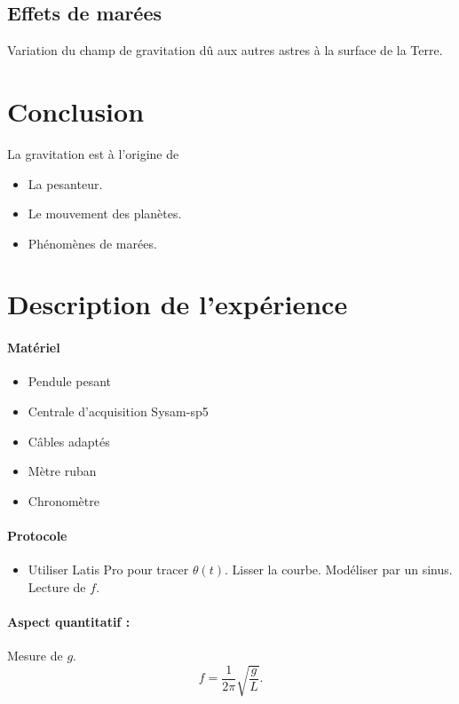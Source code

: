\documentclass[11pt]{report}
\numberwithin{figure}{section}
\numberwithin{equation}{section}
\numberwithin{table}{section}
\newcommand{\1}{\boldsymbol{1}}
\begin{document}
\subsection{Effets de marées}

Variation du champ de gravitation dû aux autres astres à la surface de la Terre.

\section*{Conclusion}

La gravitation est à l'origine de
\begin{itemize}
\item La pesanteur.
\item Le mouvement des planètes.
\item Phénomènes de marées.
\end{itemize}


\section*{Description de l'expérience}



\begin{tcolorbox}[breakable, enhanced, colback=red!2!white,colframe=mycolor!85!black,title=\textbf{\textbf{Expérience}}]
\paragraph*{Matériel}
\begin{itemize}
\item Pendule pesant
\item Centrale d'acquisition Sysam-sp5
\item Câbles adaptés
\item Mètre ruban
\item Chronomètre
\end{itemize}

\paragraph*{Protocole } 

\begin{itemize}[label=$\triangleright$]
		\item Utiliser Latis Pro pour tracer $\theta(t)$. Lisser la courbe. Modéliser par un sinus. Lecture de $f$.
\end{itemize}

\paragraph*{Aspect quantitatif :} Mesure de $g$.
\begin{equation} \nonumber
f = \frac{1}{2\pi} \sqrt{\frac{g}{L}}.
\end{equation}


\end{tcolorbox}
\end{document}

